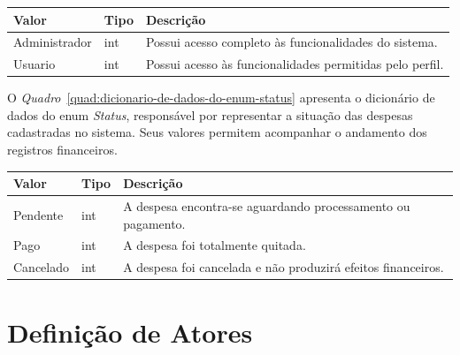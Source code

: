 \begin{quadro}[H]
\caption[Dicionário de dados do enum TipoUsuario]{Dicionário de dados do enum TipoUsuario}
\label{quad:dicionario-de-dados-do-enum-tipousuario}

\begin{tabular}{|p{}|p{}|p{}|}
\hline
\textbf{Valor} & \textbf{Tipo} & \textbf{Descrição} \\ 
\hline
Administrador & int & Possui acesso completo às funcionalidades do sistema. \\ 
\hline
Usuario & int & Possui acesso às funcionalidades permitidas pelo perfil. \\ 
\hline
\end{tabular}


\end{quadro}


O \textit{Quadro}~\ref{quad:dicionario-de-dados-do-enum-status} apresenta o dicionário de dados do enum \textit{Status}, responsável por representar a situação das despesas cadastradas no sistema. Seus valores permitem acompanhar o andamento dos registros financeiros.

\begin{quadro}[H]
\caption[Dicionário de dados do enum Status]{Dicionário de dados do enum Status}
\label{quad:dicionario-de-dados-do-enum-status}

\begin{tabular}{|p{}|p{}|p{}|}
\hline
\textbf{Valor} & \textbf{Tipo} & \textbf{Descrição} \\ 
\hline
Pendente & int & A despesa encontra-se aguardando processamento ou pagamento. \\ 
\hline
Pago & int & A despesa foi totalmente quitada. \\ 
\hline
Cancelado & int & A despesa foi cancelada e não produzirá efeitos financeiros. \\ 
\hline
\end{tabular}


\end{quadro}



\section{Definição de Atores}

